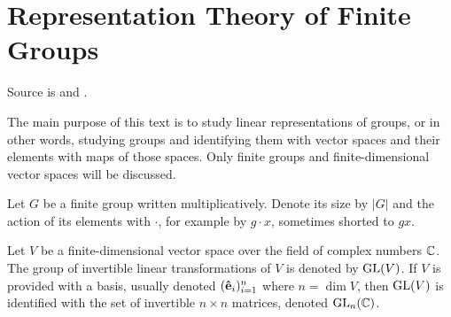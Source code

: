 \clearpage{\thispagestyle{empty}}
\section{Representation Theory of Finite Groups}

Source is \cite{FultonHarris} and \cite{Serre}.

The main purpose of this text is to study linear representations of groups, or in other words, studying groups and identifying them with vector spaces and their elements with maps of those spaces. Only finite groups and finite-dimensional vector spaces will be discussed.

Let $G$ be a finite group written multiplicatively. Denote its size by $|G|$ and the action of its elements with $\cdot$, for example by $g \cdot x$, sometimes shorted to $gx$.

Let $V$ be a finite-dimensional vector space over the field of complex numbers $\mathbb{C}$. The group of invertible linear transformations of $V$ is denoted by $\text{GL}(V)$. If $V$ is provided with a basis, usually denoted $(\mathbf{\hat{e}}_i)_{i=1}^n$ where $n = \dim V$, then $\text{GL}(V)$ is identified with the set of invertible $n \times n$ matrices, denoted $\text{GL}_n(\mathbb{C})$\cite[18.1]{DummitFoote}.

